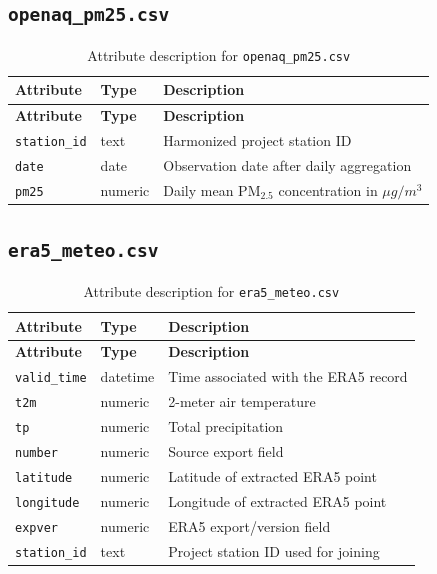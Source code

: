 \documentclass[12pt,a4paper]{report}
\begin{document}
\subsection{\texttt{openaq\_pm25.csv}}
\begin{longtable}{L{3cm}L{2cm}L{8.6cm}}
\caption{Attribute description for \texttt{openaq\_pm25.csv}}\\
\toprule
\textbf{Attribute} & \textbf{Type} & \textbf{Description} \\
\midrule
\endfirsthead
\toprule
\textbf{Attribute} & \textbf{Type} & \textbf{Description} \\
\midrule
\endhead
\texttt{station\_id} & text & Harmonized project station ID \\
\texttt{date} & date & Observation date after daily aggregation \\
\texttt{pm25} & numeric & Daily mean PM$_{2.5}$ concentration in $\mu g/m^3$ \\
\bottomrule
\end{longtable}

\subsection{\texttt{era5\_meteo.csv}}
\begin{longtable}{L{3cm}L{2cm}L{8.6cm}}
\caption{Attribute description for \texttt{era5\_meteo.csv}}\\
\toprule
\textbf{Attribute} & \textbf{Type} & \textbf{Description} \\
\midrule
\endfirsthead
\toprule
\textbf{Attribute} & \textbf{Type} & \textbf{Description} \\
\midrule
\endhead
\texttt{valid\_time} & datetime & Time associated with the ERA5 record \\
\texttt{t2m} & numeric & 2-meter air temperature \\
\texttt{tp} & numeric & Total precipitation \\
\texttt{number} & numeric & Source export field \\
\texttt{latitude} & numeric & Latitude of extracted ERA5 point \\
\texttt{longitude} & numeric & Longitude of extracted ERA5 point \\
\texttt{expver} & numeric & ERA5 export/version field \\
\texttt{station\_id} & text & Project station ID used for joining \\
\bottomrule
\end{longtable}
\end{document}
